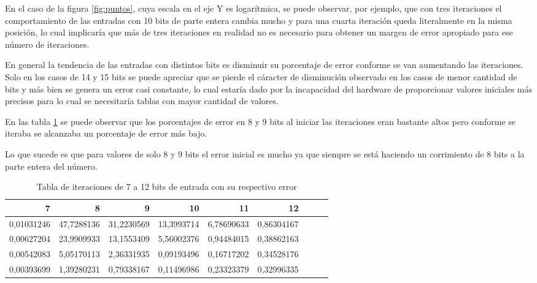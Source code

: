 En el caso de la figura \ref{fig:puntos}, cuya escala en el eje Y es logarítmica, se puede observar, por ejemplo, que con tres iteraciones el comportamiento de las entradas con 10 bits de parte entera cambia mucho y para una cuarta iteración queda literalmente en la misma posición, lo cual implicaría que más de tres iteraciones en realidad no es necesario para obtener un margen de error apropiado para ese número de iteraciones.

En general la tendencia de las entradas con distintos bits es disminuir su porcentaje de error conforme se van aumentando las iteraciones. Solo en los casos de 14 y 15 bits se puede apreciar que se pierde el cáracter de disminución observado en los casos de menor cantidad de bits y más bien se genera un error casi constante, lo cual estaría dado por la incapacidad del hardware de proporcionar valores iniciales más precisos para lo cual se necesitaría tablas con mayor cantidad de valores.

En las tabla \ref{tab:errores1} se puede observar que los porcentajes de error en 8 y 9 bits al iniciar las iteraciones eran bastante altos pero conforme se iteraba se alcanzaba un porcentaje de error más bajo.  

Lo que sucede es que para valores de solo 8 y 9 bits el error inicial es mucho ya que siempre se está haciendo un corrimiento de 8 bits a la parte entera del número. 

\begin{table}[htbp]
  \centering
  \caption{Tabla de iteraciones de 7 a 12 bits de entrada con su respectivo error}
    \begin{tabular}{rrrrrrrrr}
    \toprule
    7     & 8     & 9     & 10    & 11    & 12\\
    \midrule
    0,01031246 & 47,7288136 & 31,2230569 & 13,3993714 & 6,78690633 & 0,86304167\\
    0,00627204 & 23,9909933 & 13,1553409 & 5,56002376 & 0,94484015 & 0,38862163\\
    0,00542083 & 5,05170113 & 2,36331935 & 0,09193496 & 0,16717202 & 0,34528176\\
    0,00393699 & 1,39280231 & 0,79338167 & 0,11496986 & 0,23323379 & 0,32996335\\
    \bottomrule
    \end{tabular}%
  \label{tab:errores1}%
\end{table}%


